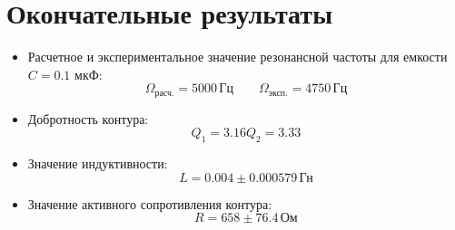 \section{Окончательные результаты}
\begin{itemize}
	\item Расчетное и экспериментальное значение
	      резонансной частоты для емкости $C = 0.1$ мкФ:
	      \[
		      \Omega_{\text{расч.}} = 5000 \, \text{Гц}
		      \qquad
		      \Omega_{\text{эксп.}} = 4750 \, \text{Гц}
	      \]

	\item Добротность контура:
	      \[
		      Q_1 = 3.16
		      Q_2 = 3.33
	      \]
	\item Значение индуктивности:
	      \[
		      L = 0.004 \pm 0.000579 \, \text{Гн}
	      \]
	\item Значение активного сопротивления контура:
	      \[
		      R = 658 \pm 76.4 \, \text{Ом}
	      \]
\end{itemize}
